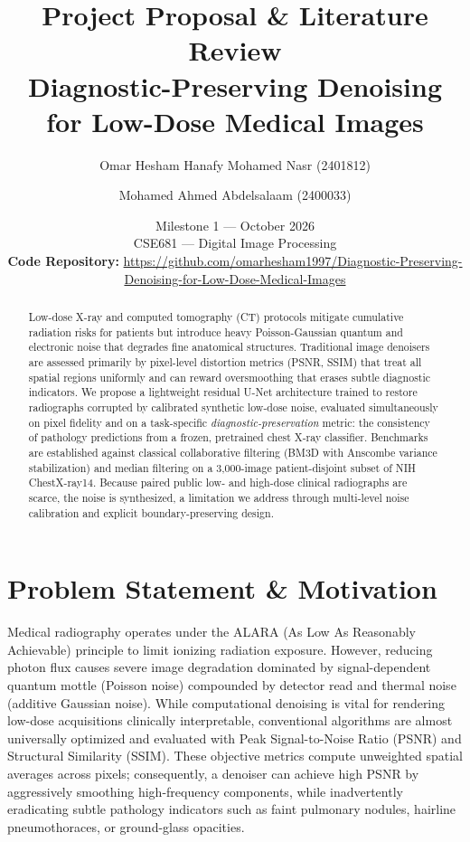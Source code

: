 \documentclass[11pt]{article}
\title{\LARGE Project Proposal \& Literature Review \\[4pt]
\large Diagnostic-Preserving Denoising for Low-Dose Medical Images}
\author{
  Omar Hesham Hanafy Mohamed Nasr (2401812) \and
  Mohamed Ahmed Abdelsalaam (2400033)
}
\date{Milestone 1 --- October 2026 \\{} CSE681 --- Digital Image Processing \\[6pt]
\normalsize \textbf{Code Repository:} \url{https://github.com/omarhesham1997/Diagnostic-Preserving-Denoising-for-Low-Dose-Medical-Images}}
\begin{document}
\maketitle

\begin{abstract}
Low-dose X-ray and computed tomography (CT) protocols mitigate cumulative radiation risks for patients but introduce heavy Poisson-Gaussian quantum and electronic noise that degrades fine anatomical structures. Traditional image denoisers are assessed primarily by pixel-level distortion metrics (PSNR, SSIM) that treat all spatial regions uniformly and can reward oversmoothing that erases subtle diagnostic indicators. We propose a lightweight residual U-Net architecture trained to restore radiographs corrupted by calibrated synthetic low-dose noise, evaluated simultaneously on pixel fidelity and on a task-specific \emph{diagnostic-preservation} metric: the consistency of pathology predictions from a frozen, pretrained chest X-ray classifier. Benchmarks are established against classical collaborative filtering (BM3D with Anscombe variance stabilization) and median filtering on a 3{,}000-image patient-disjoint subset of NIH ChestX-ray14. Because paired public low- and high-dose clinical radiographs are scarce, the noise is synthesized, a limitation we address through multi-level noise calibration and explicit boundary-preserving design.
\end{abstract}

\section{Problem Statement \& Motivation}
\label{sec:motivation}
Medical radiography operates under the ALARA (As Low As Reasonably Achievable) principle to limit ionizing radiation exposure. However, reducing photon flux causes severe image degradation dominated by signal-dependent quantum mottle (Poisson noise) compounded by detector read and thermal noise (additive Gaussian noise). While computational denoising is vital for rendering low-dose acquisitions clinically interpretable, conventional algorithms are almost universally optimized and evaluated with Peak Signal-to-Noise Ratio (PSNR) and Structural Similarity (SSIM). These objective metrics compute unweighted spatial averages across pixels; consequently, a denoiser can achieve high PSNR by aggressively smoothing high-frequency components, while inadvertently eradicating subtle pathology indicators such as faint pulmonary nodules, hairline pneumothoraces, or ground-glass opacities. 
\end{document}
